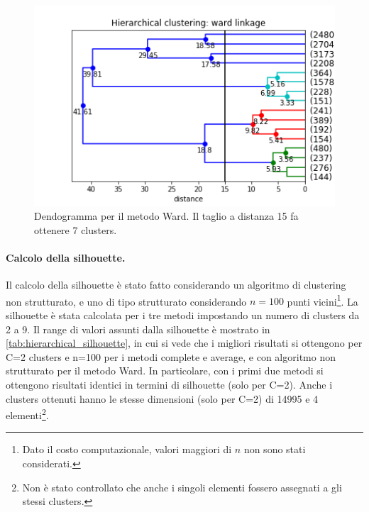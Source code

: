 \documentclass[10pt,a4paper,twocolumn]{article}
\begin{document}
\begin{figure}[hbtp]
\centering
\includegraphics[width=\columnwidth]{../images/hierarchical_clustering_ward-annotated.png}
\caption{Dendogramma per il metodo Ward. Il taglio a distanza 15 fa ottenere 7 clusters.}
\label{fig:ward_linkage}
\end{figure}

\paragraph{Calcolo della silhouette.} Il calcolo della silhouette è stato fatto considerando un algoritmo di clustering non strutturato, e uno di tipo strutturato considerando $n=100$ punti vicini\footnote{Dato il costo computazionale, valori maggiori di $n$ non sono stati considerati.}. La silhouette è stata calcolata per i tre metodi impostando un numero di clusters da 2 a 9. Il range di valori assunti dalla silhouette è mostrato in \autoref{tab:hierarchical_silhouette}, in cui si vede che i migliori risultati si ottengono per C=2 clusters e n=100 per i metodi complete e average, e con algoritmo non strutturato per il metodo Ward. In particolare, con i primi due metodi si ottengono risultati identici in termini di silhouette (solo per C=2). Anche i clusters ottenuti hanno le stesse dimensioni (solo per C=2) di 14995 e 4 elementi\footnote{Non è stato controllato che anche i singoli elementi fossero assegnati a gli stessi clusters.}.  
\end{document}
